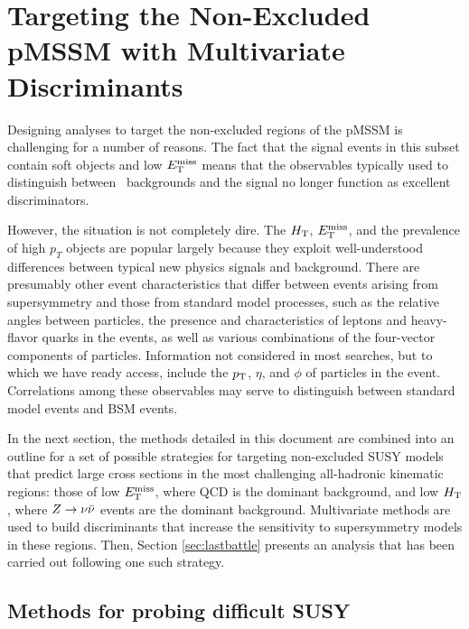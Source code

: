 \chapter{Targeting the Non-Excluded pMSSM with Multivariate Discriminants}
\label{chap:money}
\FloatBarrier

Designing analyses to target the non-excluded regions of the pMSSM is challenging for a number of reasons. The fact that the signal events in this subset contain soft objects and low $E_{\text{T}}^{\rm miss}$ means that the observables typically used to distinguish between \SM~backgrounds and the signal no longer function as excellent discriminators. 

However, the situation is not completely dire. The  $H_{\rm T}$, $E_{\text{T}}^{\rm miss}$, and the prevalence of high $p_{T}$ objects are popular largely because they exploit well-understood differences between typical new physics signals and background. There are presumably other event characteristics that differ between events arising from supersymmetry and those from standard model processes, such as the relative angles between particles, the presence and characteristics of leptons and heavy-flavor quarks in the events, as well as various combinations of the four-vector components of particles. Information not considered in most searches, but to which we have ready access, include the $p_{\text{T}}$, $\eta$, and $\phi$ of particles in the event. Correlations among these observables may serve to distinguish between standard model events and BSM events.

In the next section, the methods detailed in this document are combined into an outline for a set of possible strategies for targeting non-excluded SUSY models that predict large cross sections in the most challenging all-hadronic kinematic regions: those of low $E_{\text{T}}^{\rm miss}$, where QCD is the dominant background, and low $H_{\rm T}$, where $Z\rightarrow \nu\bar{\nu}$ events are the dominant background. Multivariate methods are used to build discriminants that increase the sensitivity to supersymmetry models in these regions. Then, Section \ref{sec:lastbattle} presents an analysis that has been carried out following one such strategy. 

\section{Methods for probing difficult SUSY}

